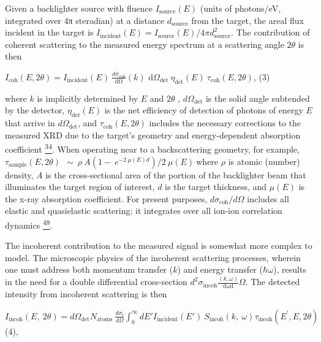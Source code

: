 Given a backlighter source with fluence
\(I_{\text{source}}\left( E \right)\) (units of photons/eV, integrated
over 4π steradian) at a distance \(d_{\text{sour}\text{ce}}\) from the
target, the areal flux incident in the target is
\(I_{\text{incident}}\left( E \right) = I_{\text{source}}\left( E \right)/4\pi d_{\text{source}}^{2}\).
The contribution of coherent scattering to the measured energy spectrum
at a scattering angle \(2\theta\) is then

\(I_{\text{coh}}\left( E,2\theta \right) = I_{\text{incident}}\left( E \right)\ \frac{d\sigma_{\text{coh}}}{\text{dΩ}}\left( k \right)\text{\ d}\Omega_{\det}\ \eta_{\det}\left( E \right)\ \tau_{\text{coh}}\left( E,2\theta \right)\),
(3)

where \(k\) is implicitly determined by \(E\) and \(2\theta\) ,
\(d\Omega_{\det}\) is the solid angle subtended by the detector,
\(\eta_{\det}\left( E \right)\) is the net efficiency of detection of
photons of energy \(E\) that arrive in \(d\Omega_{\det}\), and
\(\tau_{\text{coh}}\left( E,2\theta \right)\) includes the necessary
corrections to the measured XRD due to the target's geometry and
energy-dependent absorption coefficient
\hyperref[j.-l.-bourgade-et-al.-review-of-scientific-instruments-75-4204-2004.]{\textsuperscript{34}}.
When operating near to a backscattering geometry, for example,
\(\tau_{\text{sample}}\left( E,2\theta \right)\ \ \sim\ \rho\ A(1 - \ e^{- 2\ \mu\left( E \right)d})/2\ \mu(E)\ \)where
\(\rho\) is atomic (number) density, \(A\) is the cross-sectional area
of the portion of the backlighter beam that illuminates the target
region of interest, \(d\) is the target thickness, and
\(\mu\left( E \right)\) is the x-ray absorption coefficient. For present
purposes, \(d\sigma_{\text{coh}}/d\Omega\) includes all elastic and
quasielastic scattering; it integrates over all ion-ion correlation
dynamics
\hyperref[g.-gregori-and-d.-o.-gericke-physics-of-plasmas-16-056306-2009.]{\textsuperscript{48}}.

The incoherent contribution to the measured signal is somewhat more
complex to model. The microscopic physics of the incoherent scattering
processes, wherein one must address both momentum transfer (\(k\)) and
energy transfer (\(\text{ℏω}\)), results in the need for a double
differential cross-section
\(d^{2}\sigma_{\text{incoh}}\frac{\left( k,\omega \right)}{\text{dωd}}\Omega\).
The detected intensity from incoherent scattering is then

\(I_{\text{incoh}}\left( E,\ 2\theta \right) = d\Omega_{\det}N_{\text{atoms}}\ \frac{d\sigma_{t}}{d\Omega}\int_{0}^{\infty}{dE'I_{\text{incident}}\left( E' \right)}\ S_{\text{incoh}}\left( k,\ \omega \right)\tau_{\text{incoh}}\left( E^{'},E,2\theta \right)\)
(4),

